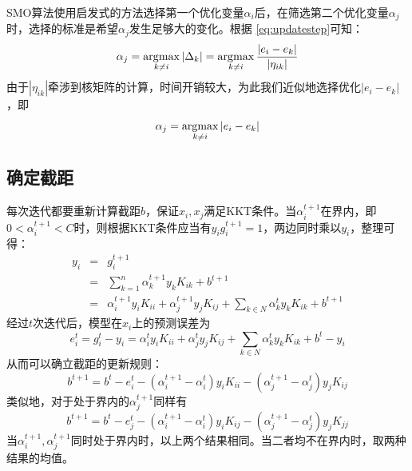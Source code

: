 SMO算法使用启发式的方法选择第一个优化变量$\alpha_i$后，在筛选第二个优化变量$\alpha_j$时，选择的标准是希望$\alpha_j$发生足够大的变化。根据
\eqref{eq:updatestep}可知：
\begin{equation}
    \alpha_j = \operatorname*{\mathrm{\arg\!\max}}\limits_{k\ne i} |\Delta_k| = \operatorname*{\mathrm{\arg\!\max}}\limits_{k\ne i} \frac{|e_i - e_k|}{|\eta_{ik}|}
\end{equation}
由于$|\eta_{ik}|$牵涉到核矩阵的计算，时间开销较大，为此我们近似地选择优化$|e_i - e_k|$，即
\begin{equation}
    \alpha_j = \operatorname*{\mathrm{\arg\!\max}}\limits_{k\ne i} |e_i - e_k|
\end{equation}

\subsection{确定截距}
每次迭代都要重新计算截距$b$，保证$x_i,x_j$满足KKT条件。当$\alpha_i^{t+1}$在界内，即$0<\alpha_i^{t+1}<C$时，则根据KKT条件应当有$y_i g_i^{t+1} = 1$，两边同时乘以$y_i$，整理可得：
\begin{equation}
    \begin{array}{lll}
        y_i & = & g_i^{t+1} \\
            & = & \sum\limits_{k=1}^n \alpha_k^{t+1} y_k K_{ik} + b^{t+1} \\
            & = & \alpha_i^{t+1} y_i K_{ii} + \alpha_j^{t+1} y_j K_{ij} + \sum\limits_{k\in N} \alpha_k^t y_k K_{ik} + b^{t+1}
    \end{array}
\end{equation}
经过$t$次迭代后，模型在$x_i$上的预测误差为
\begin{equation}
    e_i^t = g_i^t - y_i = \alpha_i^t y_i K_{ii} + \alpha_j^t y_j K_{ij} + \sum\limits_{k\in N} \alpha_k^t y_k K_{ik} + b^t - y_i
\end{equation}
从而可以确立截距的更新规则：
\begin{equation}
    b^{t+1} = b^t - e_i^t - (\alpha_i^{t+1} - \alpha_i^t) y_i K_{ii} - (\alpha_j^{t+1} - \alpha_j^t) y_j K_{ij}
\end{equation}
类似地，对于处于界内的$\alpha_j^{t+1}$同样有
\begin{equation}
    b^{t+1} = b^t - e_j^t - (\alpha_i^{t+1} - \alpha_i^t) y_i K_{ij} - (\alpha_j^{t+1} - \alpha_j^t) y_j K_{jj}
\end{equation}
当$\alpha_i^{t+1},\alpha_j^{t+1}$同时处于界内时，以上两个结果相同。当二者均不在界内时，取两种结果的均值。

